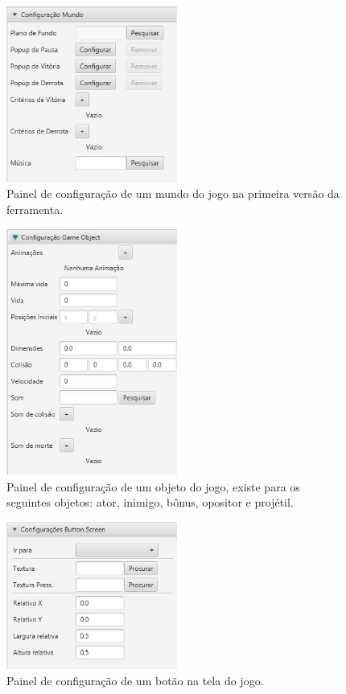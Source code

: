 \documentclass[12pt,twoside,openright,a4paper,english,brazil,sumario=tradicional]{abntex2}
\begin{document}
\begin{figure}[h]
\centering
\includegraphics[width=0.5\textwidth]{images/configurar-mundo-1.jpg}
\caption{Painel de configuração de um mundo do jogo na primeira versão da ferramenta.}
\label{fig:configurar-mundo-1}
\end{figure}

\begin{figure}[h]
\centering
\includegraphics[width=0.5\textwidth]{images/configurar-obj-1.jpg}
\caption{Painel de configuração de um objeto do jogo, existe para os seguintes objetos: ator, inimigo, bônus, opositor e projétil. }
\label{fig:configurar-obj-1}
\end{figure}

\begin{figure}[h]
\centering
\includegraphics[width=0.5\textwidth]{images/configurar-botao-1.jpg}
\caption{Painel de configuração de um botão na tela do jogo.}
\label{fig:configurar-botao-1}
\end{figure}
\end{document}
